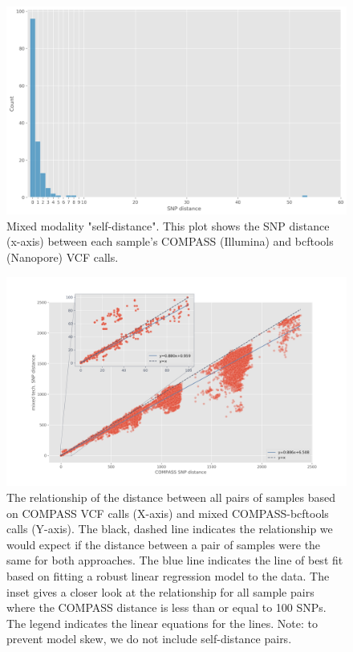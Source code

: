 \begin{figure}
\begin{center}
\includegraphics[width=0.70\columnwidth]{Chapter2/Figs/mixed_self_dist.png}
\caption{{Mixed modality "self-distance". This plot shows the SNP distance
(x-axis) between each sample's COMPASS (Illumina) and bcftools
(Nanopore) VCF calls.
{\label{166726}}%
}}
\end{center}
\end{figure}
\begin{figure}
\begin{center}
\includegraphics[width=0.70\columnwidth]{Chapter2/Figs/mixed-dotplot.png}
\caption{{The relationship of the distance between all pairs of samples based on
COMPASS VCF calls (X-axis) and mixed COMPASS-bcftools calls (Y-axis).
The black, dashed line indicates the relationship we would expect if the
distance between a pair of samples were the same for both approaches.
The blue line indicates the line of best fit based on fitting a robust
linear regression model to the data. The inset gives a closer look at
the relationship for all sample pairs where the COMPASS distance is less
than or equal to 100 SNPs. The legend indicates the linear equations for
the lines. Note: to prevent model skew, we do not include self-distance
pairs.
{\label{556408}}%
}}
\end{center}
\end{figure}
